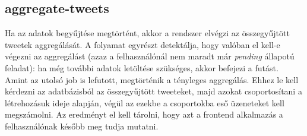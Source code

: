 \subsection{aggregate-tweets}

Ha az adatok begyűjtése megtörtént, akkor a rendszer elvégzi az összegyűjtött
tweetek aggregálását. A folyamat egyrészt detektálja, hogy valóban el kell-e
végezni az aggregálást (azaz a felhasználónál nem maradt már \emph{pending}
állapotú feladat): ha még további adatok letöltése szükséges,
akkor befejezi a futást.
Amint az utolsó job is lefutott, megtörténik a tényleges aggregálás.
Ehhez le kell kérdezni az adatbázisból az összegyűjtött tweeteket, majd
azokat csoportosítani a létrehozásuk ideje alapján, végül az ezekbe a
csoportokba eső üzeneteket kell megszámolni. Az eredményt el kell tárolni,
hogy azt a frontend alkalmazás a felhasználónak később meg tudja mutatni.
